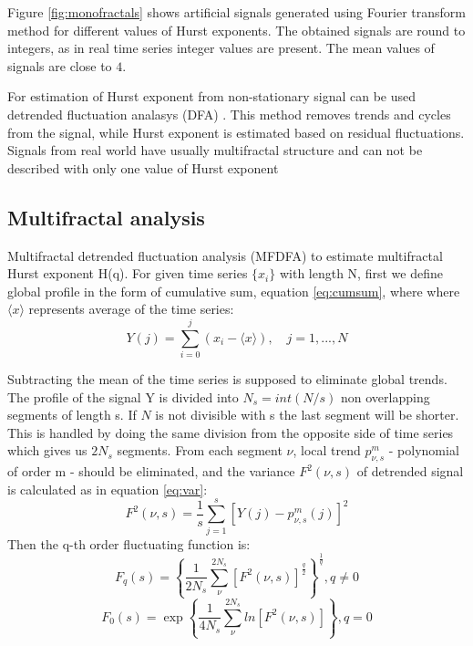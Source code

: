 Figure \ref{fig:monofractals} shows artificial signals generated using Fourier transform method for different values of Hurst exponents. The obtained signals are round to integers, as in real time series integer values are present. The mean values of signals are close to $4$.

For estimation of Hurst exponent from non-stationary signal can be used detrended fluctuation analasys (DFA) \cite{kantelhardt2001} \cite{peng1994}. This method removes trends and cycles from the signal, while Hurst exponent is estimated based on residual fluctuations. Signals from real world have usually  multifractal structure and can not be described with only one value of Hurst exponent \cite{kantelhardt2002}

\subsection{Multifractal analysis}

Multifractal detrended fluctuation analysis (MFDFA) \cite{kantelhardt2002, ihlen2012} to estimate multifractal Hurst exponent H(q). For given time series $\{x_i\}$ with length N, first we define global profile in the form of cumulative sum, equation \ref{eq:cumsum}, where where $\langle x\rangle $ represents average of the time series:
\begin{equation}
Y(j) = \sum_{i=0} ^j (x_i - \langle x\rangle), \quad j=1, ..., N
\label{eq:cumsum}
\end{equation}

Subtracting the mean of the time series is supposed to eliminate global trends. The profile of the signal Y is divided into $N_s = int (N/s)$ non overlapping segments of length s. If $N$ is not divisible with s the last segment will be shorter. This is handled by doing the same division from the opposite side of time series which gives us $2N_s$ segments. From each segment $\nu$, local trend $p^m_{\nu, s}$ - polynomial of order m - should be eliminated, and the variance $F^2(\nu, s)$ of detrended signal is calculated as in equation \ref{eq:var}:
\begin{equation}
F^2(\nu, s) = \frac{1}{s}\sum_{j=1}^s \left[Y(j) - p^m_{\nu, s}(j)\right]^2
\label{eq:var}
\end{equation}
Then the q-th order fluctuating function is: 
\begin{equation}
F_q(s) = \left\{\frac{1}{2N_s}\sum_{\nu}^{2N_s}\left[F^2(\nu, s)\right]^{\frac{q}{2}}\right\}^{\frac{1}{q}},  q \neq 0 \nonumber
\end{equation}
\begin{equation}
F_0(s) = \exp \left\{\frac{1}{4N_s}\sum_{\nu}^{2N_s}ln \left[F^2(\nu, s)\right]\right\}, q=0
\end{equation}

